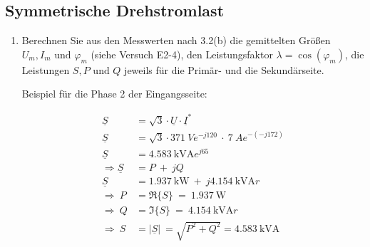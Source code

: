 \subsection{Symmetrische Drehstromlast}
\begin{enumerate}[label=\alph*)]

	\item Berechnen Sie aus den Messwerten nach 3.2(b) die gemittelten Größen $U_m, I_m
		      \text{ und } \varphi_m$ (siehe Versuch E2-4), den Leistungsfaktor $\lambda =
		      \cos(\varphi_m)$, die Leistungen $S, P \text{ und } Q$ jeweils für die Primär- und die Sekundärseite. 
			
			Beispiel für die Phase 2 der Eingangsseite:
	      \begin{center}
		      \begin{align*}
			      \underline{S}                 & = \sqrt{3}\cdot\underline{U}\cdot\underline{I}^*                                                   \\
			      \underline{S}                 & = \sqrt{3}\cdot 371\ Ve^{-j120}\ \cdot\ 7\ Ae^{-(-j172)}                                           \\
			      \underline{S}                 & = \SI{4,583}{\kilo\volt\ampere}e^{j65}                                                             \\
			      \Longrightarrow \underline{S} & =  P\ +\ jQ                                                                                        \\
			      \underline{S}                 & = \SI{1,937}{\kilo\watt}\ +\ j\SI{4,154}{\kilo\volt\ampere r}                                      \\
			      \Longrightarrow\ P            & = \Re{\{S\}}\                                                   =\   \SI{1,937}{\watt}             \\
			      \Longrightarrow\ Q            & = \Im{\{S\}}\                                                   =\ \SI{4,154}{\kilo\volt\ampere r} \\
			      \Longrightarrow\ S            & =  \left\lvert {\underline{S}}  \right\rvert\ = \sqrt{P^2+Q^2} = \SI{4,583}{\kilo\volt\ampere}     \\               \\
		      \end{align*}
	      \end{center}


\end{enumerate}

